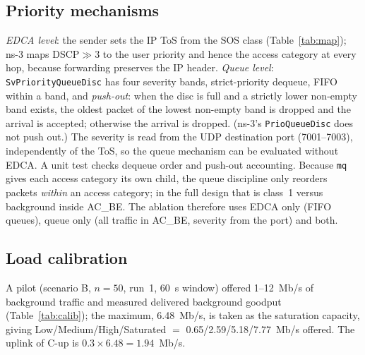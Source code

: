 \subsection{Priority mechanisms}
\emph{EDCA level}: the sender sets the IP ToS from the SOS class (Table~\ref{tab:map}); ns-3 maps DSCP$\gg3$ to the user priority and
hence the access category at every hop, because forwarding preserves the IP header.
\emph{Queue level}: \texttt{SvPriorityQueueDisc} has four severity bands, strict-priority dequeue, FIFO within a band, and \emph{push-out}:
when the disc is full and a strictly lower non-empty band exists, the oldest packet of the lowest non-empty band is dropped and the arrival is accepted;
otherwise the arrival is dropped. (ns-3's \texttt{PrioQueueDisc} does not push out.) The severity is read from the UDP destination port
(7001--7003), independently of the ToS, so the queue mechanism can be evaluated without EDCA. A unit test checks dequeue order and
push-out accounting. Because \texttt{mq} gives each access category its own child, the queue discipline only reorders packets \emph{within} an
access category; in the full design that is class~1 versus background inside AC\_BE. The ablation therefore uses EDCA only (FIFO queues),
queue only (all traffic in AC\_BE, severity from the port) and both.

\subsection{Load calibration}\label{sec:calib}
A pilot (scenario B, $n=50$, run~1, 60~s window) offered 1--12~Mb/s of background traffic and measured delivered background goodput
(Table~\ref{tab:calib}); the maximum, 6.48~Mb/s, is taken as the saturation capacity, giving Low/Medium/High/Saturated $=$
0.65/2.59/5.18/7.77~Mb/s offered. The uplink of C-up is $0.3\times6.48=1.94$~Mb/s.
\begin{table}[t]\centering\caption{Saturation calibration of the 50-node mesh (scenario B, one run per point).}\label{tab:calib}
\resizebox{\columnwidth}{!}{}\end{table}

